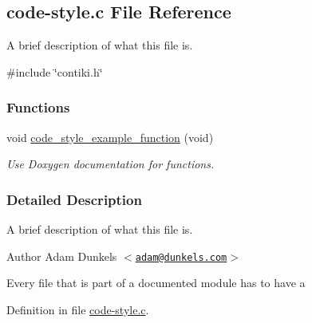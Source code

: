 \hypertarget{a00020}{\subsection{code-\/style.c \-File \-Reference}
\label{a00020}
}


\-A brief description of what this file is.  


{\ttfamily \#include \char`\"{}contiki.\-h\char`\"{}}\*
\subsubsection*{\-Functions}
\begin{DoxyCompactItemize}
\item 
void \hyperlink{a00063_gaf4091e5d6984567763b6f5b792d2407f}{code\-\_\-style\-\_\-example\-\_\-function} (void)
\begin{DoxyCompactList}\small\item\em \-Use \-Doxygen documentation for functions. \end{DoxyCompactList}\end{DoxyCompactItemize}


\subsubsection{\-Detailed \-Description}
\-A brief description of what this file is. \begin{DoxyAuthor}{\-Author}
\-Adam \-Dunkels $<$\href{mailto:adam@dunkels.com}{\tt adam@dunkels.\-com}$>$
\end{DoxyAuthor}
\-Every file that is part of a documented module has to have a 

\-Definition in file \hyperlink{a00020_source}{code-\/style.\-c}.

